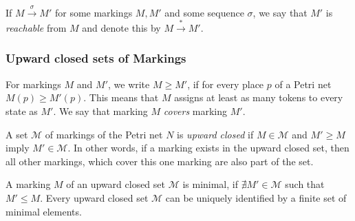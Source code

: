 If $M \xrightarrow{\sigma} M'$ for some markings $M,M'$ and some sequence $\sigma$, we say that $M'$ is \emph{reachable} from $M$ and denote this by $M \xrightarrow{*} M'$.


\subsubsection{Upward closed sets of Markings}
For markings $M$ and $M'$, we write $M \ge M'$, if for every place $p$ of a Petri net $M(p) \ge M'(p)$. This means that $M$ assigns at least as many tokens to every state as $M'$. We say that marking $M$ \emph{covers} marking $M'$.


A set $\mathcal{M}$ of markings of the Petri net $N$ is \emph{upward closed} if $M \in \mathcal{M}$ and $M' \ge M$ imply $M' \in \mathcal{M}$. In other words, if a marking exists in the upward closed set, then all other markings, which cover this one marking are also part of the set.

A marking $M$ of an upward closed set $\mathcal{M}$ is minimal, if $\nexists M' \in \mathcal{M}$ such that $M' \le M$. Every upward closed set $\mathcal{M}$ can be uniquely identified by a finite set of minimal elements. 
